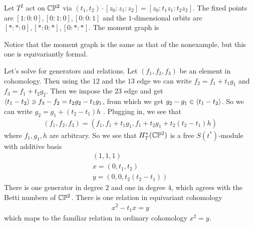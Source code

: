 \documentclass[12pt]{article}
\begin{document}
\begin{example}
    Let $T^2$ act on $\mathbb{C}\mathbb{P}^2$ via $(t_1,t_2)\cdot [z_0:z_1:z_2] = [z_0:t_1z_1:t_2z_2]$.
    The fixed points are $[1:0:0],[0:1:0],[0:0:1]$ and the $1$-dimensional orbits are $[*:*:0], [*:0:*],[0:*:*]$.
    The moment graph is \begin{center}
    \end{center}
    Notice that the moment graph is the same as that of the nonexample, but this one is equivariantly formal.

    \hfill 

    Let's solve for generators and relations. Let $(f_1,f_2,f_3)$ be an element in cohomology.
    Then using the $12$ and the $13$ edge we can write $f_2 = f_1 + t_1g_1$ and $f_3 = f_1 + t_2g_2$.
    Then we impose the $23$ edge and get $\langle{t_1 - t_2}\rangle\ni f_3 - f_2 = t_2g_2 - t_1g_1$, from 
    which we get $g_2 - g_1 \in \langle{t_1 - t_2}\rangle$. So we can write $g_2 = g_1 + (t_2 - t_1)h$ .
    Plugging in, we see that \begin{align*}
        (f_1,f_2,f_3) = (f_1,f_1 + t_1g_1, f_1 + t_2g_1 + t_2(t_2 - t_1)h)
    \end{align*} where $f_1,g_1,h$ are arbitrary. So we see that $H_T^*(\mathbb{C}\mathbb{P}^2)$ is a free $S(t^*)$-module
    with additive basis \begin{align*}
        (1,1,1) \\ x = (0,t_1,t_2) \\ y = (0,0,t_2(t_2 - t_1))
    \end{align*} There is one generator in degree $2$ and one in degree $4$, which agrees with the Betti numbers of $\mathbb{C}\mathbb{P}^2$. There is one relation in equivariant cohomology \begin{align*}
        x^2 - t_1x = y
    \end{align*} which maps to the familiar relation in ordinary cohomology $x^2 = y$.
\end{example}
\end{document}
